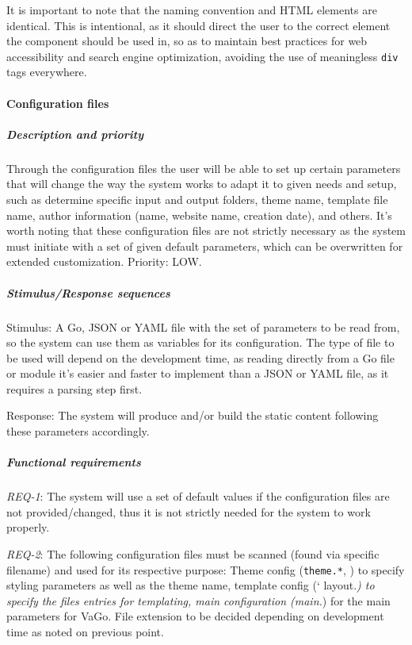 It is important to note that the naming convention and HTML elements are
identical. This is intentional, as it should direct the user to the
correct element the component should be used in, so as to maintain best
practices for web accessibility and search engine optimization, avoiding
the use of meaningless \texttt{div} tags everywhere.

\paragraph{Configuration files}\label{par:configuration-files}

\subparagraph{Description and
priority}\label{subpar:description-and-priority-3}

Through the configuration files the user will be able to set up certain
parameters that will change the way the system works to adapt it to
given needs and setup, such as determine specific input and output
folders, theme name, template file name, author information (name,
website name, creation date), and others. It's worth noting that these
configuration files are not strictly necessary as the system must
initiate with a set of given default parameters, which can be
overwritten for extended customization. Priority: LOW.

\subparagraph{Stimulus/Response
sequences}\label{subpar:stimulusresponse-sequences-3}

Stimulus: A Go, JSON or YAML file with the set of parameters to be read
from, so the system can use them as variables for its configuration. The
type of file to be used will depend on the development time, as reading
directly from a Go file or module it's easier and faster to implement
than a JSON or YAML file, as it requires a parsing step first.

Response: The system will produce and/or build the static content
following these parameters accordingly.

\subparagraph{Functional requirements}\label{subpar:functional-requirements-2}

\emph{REQ-1}: The system will use a set of default values if the
configuration files are not provided/changed, thus it is not strictly
needed for the system to work properly.

\emph{REQ-2}: The following configuration files must be scanned (found
via specific filename) and used for its respective purpose: Theme config
(\texttt{theme.*}, ) to specify styling parameters as well as the theme
name, template config (` layout.\emph{) to specify the files entries for
templating, main configuration (main.}) for the main parameters for
VaGo. File extension to be decided depending on development time as
noted on previous point.

